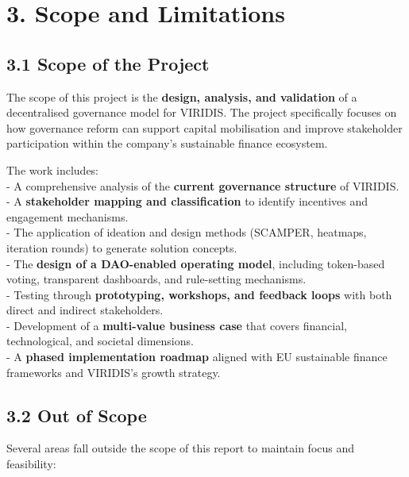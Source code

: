 \documentclass[
  english,
  12pt,
  oneside,
  open=any]{scrbook}
\begin{document}
\chapter{3. Scope and Limitations}\label{sec-scope}

\section{3.1 Scope of the Project}\label{sec-in}

The scope of this project is the \textbf{design, analysis, and
validation} of a decentralised governance model for VIRIDIS. The project
specifically focuses on how governance reform can support capital
mobilisation and improve stakeholder participation within the company's
sustainable finance ecosystem.

The work includes:\\
- A comprehensive analysis of the \textbf{current governance structure}
of VIRIDIS.\\
- A \textbf{stakeholder mapping and classification} to identify
incentives and engagement mechanisms.\\
- The application of ideation and design methods (SCAMPER, heatmaps,
iteration rounds) to generate solution concepts.\\
- The \textbf{design of a DAO-enabled operating model}, including
token-based voting, transparent dashboards, and rule-setting
mechanisms.\\
- Testing through \textbf{prototyping, workshops, and feedback loops}
with both direct and indirect stakeholders.\\
- Development of a \textbf{multi-value business case} that covers
financial, technological, and societal dimensions.\\
- A \textbf{phased implementation roadmap} aligned with EU sustainable
finance frameworks and VIRIDIS's growth strategy.

\section{3.2 Out of Scope}\label{sec-out}

Several areas fall outside the scope of this report to maintain focus
and feasibility:
\end{document}
